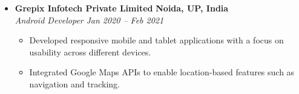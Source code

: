 \documentclass[10pt, a4paper]{article}
\begin{document}
\begin{itemize}[leftmargin=0pt, itemsep=1ex, topsep=0.5ex, partopsep=0pt]
    \item
\textbf{Grepix Infotech Private Limited} \hfill \textbf{Noida, UP, India} \\
\textit{Android Developer} \hfill \textit{Jan 2020 -- Feb 2021}
\begin{itemize}[leftmargin=1.5em, itemsep=0.5ex, topsep=0.5ex]
    \item Developed responsive mobile and tablet applications with a focus on usability across different devices.
    \item Integrated Google Maps APIs to enable location-based features such as navigation and tracking.
\end{itemize}
\end{itemize}
    
\newpage
    

\end{document}
